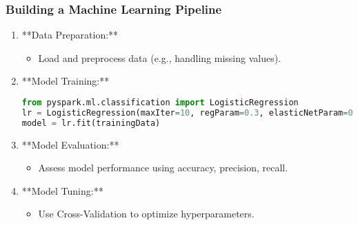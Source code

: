 \documentclass[aspectratio=169]{beamer}
\begin{document}
\begin{frame}[fragile]
    \frametitle{Building a Machine Learning Pipeline}
    \begin{enumerate}
        \item **Data Preparation:**
            \begin{itemize}
                \item Load and preprocess data (e.g., handling missing values).
            \end{itemize}
        \item **Model Training:**
            \begin{lstlisting}[language=Python]
from pyspark.ml.classification import LogisticRegression
lr = LogisticRegression(maxIter=10, regParam=0.3, elasticNetParam=0.8)
model = lr.fit(trainingData)
            \end{lstlisting}
        \item **Model Evaluation:**
            \begin{itemize}
                \item Assess model performance using accuracy, precision, recall.
            \end{itemize}
        \item **Model Tuning:**
            \begin{itemize}
                \item Use Cross-Validation to optimize hyperparameters.
            \end{itemize}
    \end{enumerate}
\end{frame}
\end{document}
